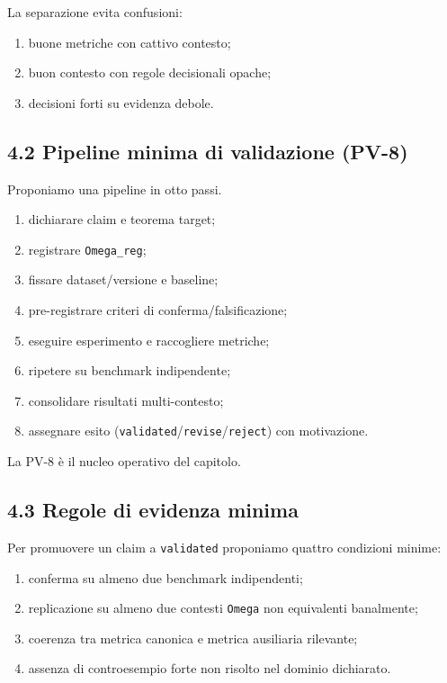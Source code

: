 La separazione evita confusioni:

\begin{enumerate}
\def\labelenumi{\arabic{enumi}.}
\tightlist
\item
  buone metriche con cattivo contesto;
\item
  buon contesto con regole decisionali opache;
\item
  decisioni forti su evidenza debole.
\end{enumerate}

\subsection{4.2 Pipeline minima di validazione (PV-8)}

Proponiamo una pipeline in otto passi.

\begin{enumerate}
\def\labelenumi{\arabic{enumi}.}
\tightlist
\item
  dichiarare claim e teorema target;
\item
  registrare \texttt{Omega\_reg};
\item
  fissare dataset/versione e baseline;
\item
  pre-registrare criteri di conferma/falsificazione;
\item
  eseguire esperimento e raccogliere metriche;
\item
  ripetere su benchmark indipendente;
\item
  consolidare risultati multi-contesto;
\item
  assegnare esito (\texttt{validated}/\texttt{revise}/\texttt{reject}) con motivazione.
\end{enumerate}

La PV-8 è il nucleo operativo del capitolo.

\subsection{4.3 Regole di evidenza minima}

Per promuovere un claim a \texttt{validated} proponiamo quattro condizioni minime:

\begin{enumerate}
\def\labelenumi{\arabic{enumi}.}
\tightlist
\item
  conferma su almeno due benchmark indipendenti;
\item
  replicazione su almeno due contesti \texttt{Omega} non equivalenti banalmente;
\item
  coerenza tra metrica canonica e metrica ausiliaria rilevante;
\item
  assenza di controesempio forte non risolto nel dominio dichiarato.
\end{enumerate}

